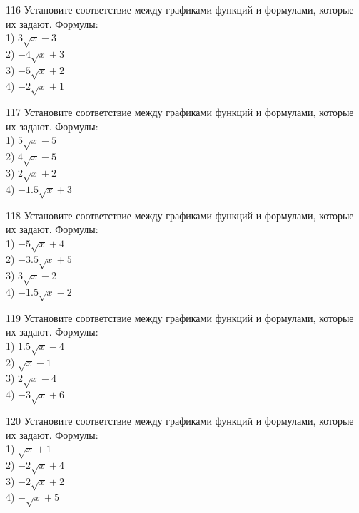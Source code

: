 \documentclass[4apaper]{article}
\begin{document}
\begin{taskBN}{116}
Установите соответствие между графиками функций и формулами, которые их задают. Формулы: \\1) $3\sqrt{x}-3$\\2) $-4\sqrt{x}+3$\\3) $-5\sqrt{x}+2$\\4) $-2\sqrt{x}+1$
\end{taskBN}

\begin{taskBN}{117}
Установите соответствие между графиками функций и формулами, которые их задают. Формулы: \\1) $5\sqrt{x}-5$\\2) $4\sqrt{x}-5$\\3) $2\sqrt{x}+2$\\4) $-1.5\sqrt{x}+3$
\end{taskBN}

\begin{taskBN}{118}
Установите соответствие между графиками функций и формулами, которые их задают. Формулы: \\1) $-5\sqrt{x}+4$\\2) $-3.5\sqrt{x}+5$\\3) $3\sqrt{x}-2$\\4) $-1.5\sqrt{x}-2$
\end{taskBN}

\begin{taskBN}{119}
Установите соответствие между графиками функций и формулами, которые их задают. Формулы: \\1) $1.5\sqrt{x}-4$\\2) $\sqrt{x}-1$\\3) $2\sqrt{x}-4$\\4) $-3\sqrt{x}+6$
\end{taskBN}

\begin{taskBN}{120}
Установите соответствие между графиками функций и формулами, которые их задают. Формулы: \\1) $\sqrt{x}+1$\\2) $-2\sqrt{x}+4$\\3) $-2\sqrt{x}+2$\\4) $-\sqrt{x}+5$
\end{taskBN}
\end{document}
